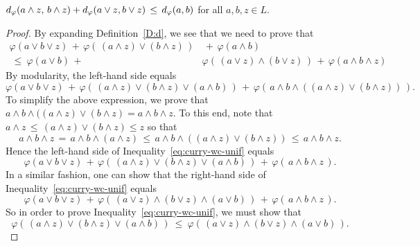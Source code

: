 \documentclass[main.tex]{subfiles}
\begin{document}
%
\begin{lem}
\label{L:curry-wc-unif}
\quad
$d_{\smash{\varphi}}(a\wedge z,\,b\wedge z)+
 d_{\smash{\varphi}}(a\vee z,b\vee z)\,\leq\,d_{\smash{\varphi}}(a,b)$
\quad for all $a,b,z\in L$.
\end{lem}
\begin{proof}
By expanding Definition~\ref{D:d},
we see that 
we need to prove that
\begin{equation}
\label{eq:curry-wc-unif}
\begin{split}
\varphi(a\vee b\vee z) \,+\,
\varphi(\,(a\wedge z)\vee(b\wedge z)\,) & \,+\,
\varphi(a\wedge b) \\
\ \leq\ 
\varphi(a \vee b)  \,+\, &
\varphi(\,(a\vee z)\wedge(b\vee z)\,) \,+\,
\varphi(a\wedge b \wedge z)
\end{split}
\end{equation}
By modularity,
the left-hand side equals
\begin{equation*}
\varphi(a\vee b \vee z) \,+\,
\varphi(\, (a\wedge z) \vee (b\wedge z) \vee (a\wedge b)\,) \,+\,
\varphi(\,a\wedge b\wedge ( (a \wedge z) \vee (b\wedge z) )\,).
\end{equation*}
To simplify the above expression,
we prove that
$a\wedge b\wedge ( (a \wedge z) \vee (b\wedge z)=a\wedge b\wedge z$.
To this end, note that
$a\wedge z \,\leq\, (a\wedge z)\vee (b\wedge z) \leq z$
so that 
\begin{equation*}
a\wedge b\wedge z
\, =\, a\wedge b \wedge (a\wedge z)
\,\leq\, a\wedge b \wedge ((a\wedge z)\vee (b\wedge z))
\,\leq\, a\wedge b \wedge z.
\end{equation*}
Hence the left-hand side of Inequality~\eqref{eq:curry-wc-unif}
equals
\begin{equation*}
\varphi(a\vee b \vee z) \,+\,
\varphi(\, (a\wedge z) \vee (b\wedge z) \vee (a\wedge b)\,) \,+\,
\varphi(\,a\wedge b\wedge z\,).
\end{equation*}
In a similar fashion,
one can show that the right-hand side of Inequality~\eqref{eq:curry-wc-unif}
equals
\begin{equation*}
\varphi(a\vee b \vee z) \,+\,
\varphi(\, (a\vee z) \wedge (b\vee z) \wedge (a\vee b)\,) \,+\,
\varphi(\,a\wedge b\wedge z\,).
\end{equation*}
So in order to prove Inequality~\eqref{eq:curry-wc-unif},
we must show that
\begin{equation*}
\varphi(\, (a\wedge z) \vee (b\wedge z) \vee (a\wedge b)\,) 
\ \leq\ 
\varphi(\, (a\vee z) \wedge (b\vee z) \wedge (a\vee b)\,).
\end{equation*}

\end{proof}
\end{document}
